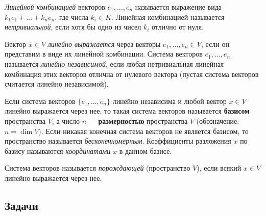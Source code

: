 \textit{Линейной комбинацией} векторов $e_1,\dots,e_n$ называется выражение вида $k_1e_1+\dots+k_ne_n$, где числа $k_i\in K$. Линейная комбинацией называется \textit{нетривиальной}, если хотя бы одно из чисел $k_i$ отлично от нуля.

Вектор $x\in V$ \textit{линейно выражается} через векторы $e_1,\dots,e_n\in V$, если он представим в виде их линейной комбинации. Система векторов $e_1,\dots,e_n$ называется \textit{линейно независимой}, если любая нетривиальная линейная комбинация этих векторов отлична от нулевого вектора (пустая система векторов считается линейно независимой).

Если система векторов $\{e_1,\dots, e_n\}$ линейно независима и любой вектор $x\in V$ линейно выражается через нее, то такая система векторов называется \textbf{базисом} пространства $V$, а число $n$ --- \textbf{размерностью} пространства $V$ (обозначение: $n=\dim V$). Если никакая конечная система векторов не является базисом, то пространство называется \textit{бесконечномерным}. Коэффициенты разложения $x$ по базису называются \textit{координатами} $x$ в данном базисе.

Система векторов называется \textit{порождающей} (пространство $V$), если всякий $x\in V$ линейно выражается через нее.

\subsection*{Задачи}

